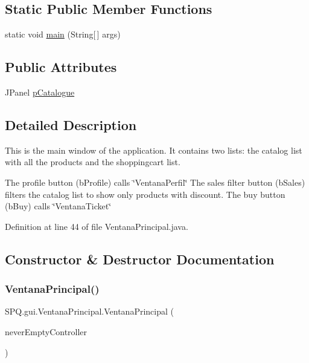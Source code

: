 \subsection*{Static Public Member Functions}
\begin{DoxyCompactItemize}
\item 
static void \mbox{\hyperlink{class_s_p_q_1_1gui_1_1_ventana_principal_a48fb869f7efb018079dac708ed20f7d3}{main}} (String\mbox{[}$\,$\mbox{]} args)
\end{DoxyCompactItemize}
\subsection*{Public Attributes}
\begin{DoxyCompactItemize}
\item 
J\+Panel \mbox{\hyperlink{class_s_p_q_1_1gui_1_1_ventana_principal_a0835e35fdf5ad82ba10366336f5fbdb4}{p\+Catalogue}}
\end{DoxyCompactItemize}


\subsection{Detailed Description}
This is the main window of the application. It contains two lists\+: the catalog list with all the products and the shoppingcart list. 

The profile button (b\+Profile) calls \char`\"{}\+Ventana\+Perfil\char`\"{} The sales filter button (b\+Sales) filters the catalog list to show only products with discount. The buy button (b\+Buy) calls \char`\"{}\+Ventana\+Ticket\char`\"{} 

Definition at line 44 of file Ventana\+Principal.\+java.



\subsection{Constructor \& Destructor Documentation}
\mbox{\label{class_s_p_q_1_1gui_1_1_ventana_principal_ab35bb8c8e3a0b03050093cc3d6b58a90}} 
\subsubsection{\texorpdfstring{Ventana\+Principal()}{VentanaPrincipal()}}
{\footnotesize\ttfamily S\+P\+Q.\+gui.\+Ventana\+Principal.\+Ventana\+Principal (\begin{DoxyParamCaption}\item[{\mbox{\hyperlink{class_s_p_q_1_1controller_1_1_never_empty_controller}{Never\+Empty\+Controller}}}]{never\+Empty\+Controller }\end{DoxyParamCaption})}



